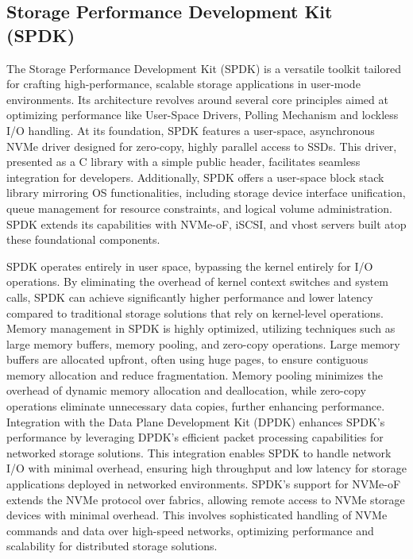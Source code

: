 \subsection{Storage Performance Development Kit (SPDK)}
The Storage Performance Development Kit (SPDK) is a versatile toolkit tailored
for crafting high-performance, scalable storage applications in user-mode
environments. Its architecture revolves around several core principles aimed at
optimizing performance like User-Space Drivers, Polling Mechanism and lockless
I/O handling. At its foundation, SPDK features a user-space, asynchronous NVMe
driver designed for zero-copy, highly parallel access to SSDs. This driver,
presented as a C library with a simple public header, facilitates seamless
integration for developers. Additionally, SPDK offers a user-space block stack
library mirroring OS functionalities, including storage device interface
unification, queue management for resource constraints, and logical volume
administration. SPDK extends its capabilities with NVMe-oF, iSCSI, and vhost
servers built atop these foundational components. 

SPDK operates entirely in user space, bypassing the kernel entirely for I/O operations. By eliminating the overhead of kernel context switches and system calls, SPDK can achieve significantly higher performance and lower latency compared to traditional storage solutions that rely on kernel-level operations. Memory management in SPDK is highly optimized, utilizing techniques such as large memory buffers, memory pooling, and zero-copy operations. Large memory buffers are allocated upfront, often using huge pages, to ensure contiguous memory allocation and reduce fragmentation. Memory pooling minimizes the overhead of dynamic memory allocation and deallocation, while zero-copy operations eliminate unnecessary data copies, further enhancing performance. Integration with the Data Plane Development Kit (DPDK) enhances SPDK's performance by leveraging DPDK's efficient packet processing capabilities for networked storage solutions. This integration enables SPDK to handle network I/O with minimal overhead, ensuring high throughput and low latency for storage applications deployed in networked environments. SPDK's support for NVMe-oF extends the NVMe protocol over fabrics, allowing remote access to NVMe storage devices with minimal overhead. This involves sophisticated handling of NVMe commands and data over high-speed networks, optimizing performance and scalability for distributed storage solutions. 

